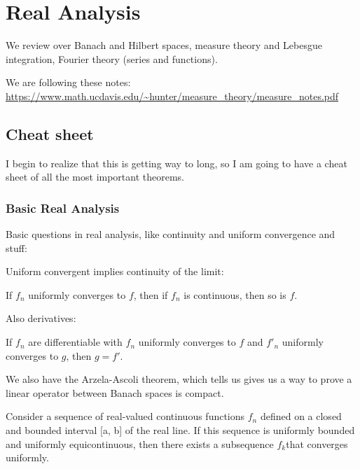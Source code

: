 \documentclass[main.tex]{subfiles}
\begin{document}
\section{Real Analysis}

We review over Banach and Hilbert spaces, measure theory and Lebesgue integration, Fourier theory (series and functions). 

We are following these notes: \url{https://www.math.ucdavis.edu/~hunter/measure_theory/measure_notes.pdf}


\subsection{Cheat sheet}
I begin to realize that this is getting way to long, so I am going to have a cheat sheet of all the most important theorems. 

\subsubsection{Basic Real Analysis}
Basic questions in real analysis, like continuity and uniform convergence and stuff:

Uniform convergent implies continuity of the limit:

\begin{theorem}
If $f_n$ uniformly converges to $f$, then if $f_n$ is continuous, then so is $f$.
\end{theorem}

Also derivatives:

\begin{theorem}
If $f_n$ are differentiable with $f_n$ uniformly converges to $f$ and $f' _n$ uniformly converges to $g$, then $g = f'$.
\end{theorem}

We also have the Arzela-Ascoli theorem, which tells us gives us a way to prove a linear operator between Banach spaces is compact.

\begin{theorem}
Consider a sequence of real-valued continuous functions ${f}_n$ defined on a closed and bounded interval [a, b] of the real line. If this sequence is uniformly bounded and uniformly equicontinuous, then there exists a subsequence ${f}_k$that converges uniformly.
\end{theorem}
\end{document}
